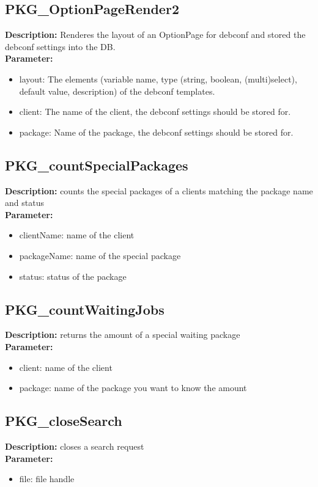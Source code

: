 \subsection{PKG\_OptionPageRender2}
\textbf{Description:} Renderes the layout of an OptionPage for debconf and stored the debconf settings into the DB.\\
\textbf{Parameter:}
\begin{itemize}
\item layout: The elements (variable name, type (string, boolean, (multi)select), default value, description) of the debconf templates.
\item client: The name of the client, the debconf settings should be stored for.
\item package: Name of the package, the debconf settings should be stored for.
\end{itemize}

\subsection{PKG\_countSpecialPackages}
\textbf{Description:} counts the special packages of a clients matching the package name and status\\
\textbf{Parameter:}
\begin{itemize}
\item clientName: name of the client 
\item packageName: name of the special package
\item status: status of the package
\end{itemize}

\subsection{PKG\_countWaitingJobs}
\textbf{Description:} returns the amount of a special waiting package\\
\textbf{Parameter:}
\begin{itemize}
\item client: name of the client
\item package: name of the package you want to know the amount
\end{itemize}

\subsection{PKG\_closeSearch}
\textbf{Description:} closes a search request\\
\textbf{Parameter:}
\begin{itemize}
\item file: file handle
\end{itemize}

